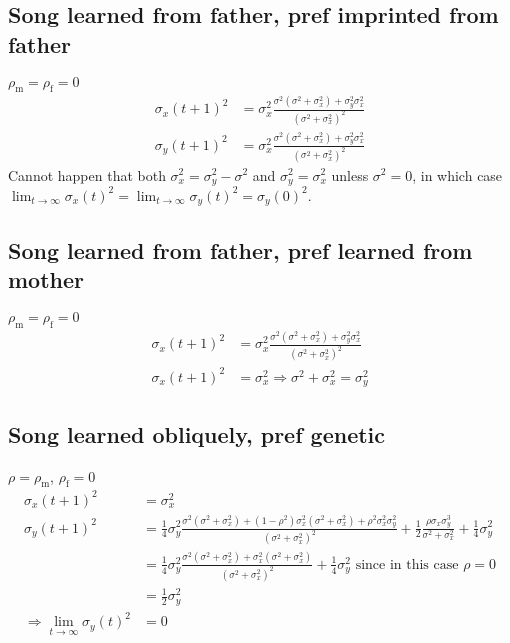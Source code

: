 \documentclass{article}
\newcommand{\x}[1]{\text{#1}}
\begin{document}
\begin{landscape}
\subsection{Song learned from father, pref imprinted from father } 
$\rho_\x{m}=\rho_\x{f}=0$
\begin{align*}
\sigma_x(t+1)^2&=\sigma_x^2\frac{\sigma^2(\sigma^2+\sigma_x^2)+\sigma_y^2\sigma_x^2}{(\sigma^2+\sigma_x^2)^2} 
\\ \sigma_y(t+1)^2&=\sigma_x^2\frac{\sigma^2(\sigma^2+\sigma_x^2)+\sigma_y^2\sigma_x^2}{(\sigma^2+\sigma_x^2)^2}
\end{align*}
Cannot happen that both $\sigma_x^2=\sigma_y^2-\sigma^2$ and $\sigma_y^2=\sigma_x^2$ unless $\sigma^2=0$, in which case $\lim_{t\to\infty}\sigma_x(t)^2=\lim_{t\to\infty}\sigma_y(t)^2=\sigma_y(0)^2$.
\subsection{Song learned from father, pref learned from mother }
$\rho_\x{m}=\rho_\x{f}=0$
\begin{align*}
\sigma_x(t+1)^2&=\sigma_x^2\frac{\sigma^2(\sigma^2+\sigma_x^2)+\sigma_y^2\sigma_x^2}{(\sigma^2+\sigma_x^2)^2}
\\ \sigma_x(t+1)^2&=\sigma_x^2 \Rightarrow \sigma^2+\sigma_x^2=\sigma_y^2
\end{align*}
\subsection{Song learned obliquely, pref genetic }
$\rho=\rho_\x{m}$, $\rho_\x{f}=0$
\begin{align*}
\sigma_x(t+1)^2&=\sigma_x^2
\\ \sigma_y(t+1)^2&=\frac{1}{4}\sigma_y^2\frac{\sigma^2(\sigma^2+\sigma_x^2)+(1-\rho^2)\sigma_x^2(\sigma^2+\sigma_x^2)+\rho^2\sigma_x^2\sigma_y^2}{(\sigma^2+\sigma_x^2)^2}+\frac{1}{2}\frac{\rho\sigma_x\sigma_y^3}{\sigma^2+\sigma_x^2}+\frac{1}{4}\sigma_y^2 
\\&=\frac{1}{4}\sigma_y^2\frac{\sigma^2(\sigma^2+\sigma_x^2)+\sigma_x^2(\sigma^2+\sigma_x^2)}{(\sigma^2+\sigma_x^2)^2}+\frac{1}{4}\sigma_y^2  \text{ since in this case $\rho=0$}
\\&=\frac{1}{2}\sigma_y^2
\\ \Rightarrow \lim_{t\to\infty}\sigma_y(t)^2&=0
\end{align*}

\end{landscape}
\end{document}
